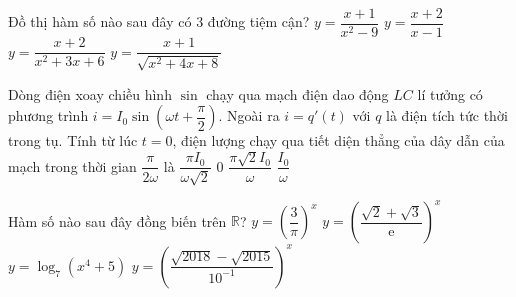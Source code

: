 \begin{ex}%
Đồ thị hàm số nào sau đây có $3$ đường tiệm cận?
\choice
{\True $y=\dfrac{x+1}{x^2-9}$}
{$y=\dfrac{x+2}{x-1}$}
{$y=\dfrac{x+2}{x^2+3x+6}$}
{$y=\dfrac{x+1}{\sqrt{x^2+4x+8}}$}
\end{ex}

\begin{ex}%
Dòng điện xoay chiều hình $\sin$ chạy qua mạch điện dao động $LC$ lí tưởng có phương trình $i=I_0\sin\left( \omega t+\dfrac{\pi}{2} \right)$. Ngoài ra $i=q'(t)$ với $q$ là điện tích tức thời trong tụ. Tính từ lúc $t=0$, điện lượng chạy qua tiết diện thẳng của dây dẫn của mạch trong thời gian $\dfrac{\pi}{2\omega}$ là
\choice
{$\dfrac{\pi I_0}{\omega \sqrt{2}}$}
{$0$}
{$\dfrac{\pi \sqrt{2}I_0}{\omega}$}
{\True $\dfrac{I_0}{\omega}$}
\end{ex}

\begin{ex}%
Hàm số nào sau đây đồng biến trên $\mathbb{R}$?
\choice
{$y=\left( \dfrac{3}{\pi} \right)^x$}
{\True $y=\left( \dfrac{\sqrt{2}+\sqrt{3}}{\mathrm{e}} \right)^x$}
{$y=\log_7 \left( x^4+5 \right)$}
{$y=\left(\dfrac{\sqrt{2018}-\sqrt{2015}}{10^{-1}}\right)^x$}
\end{ex}

